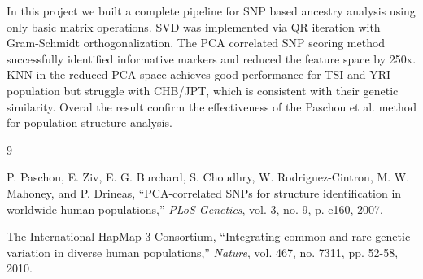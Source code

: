 \documentclass[conference]{IEEEtran}
\begin{document}
In this project we built a complete pipeline for SNP based ancestry analysis using only basic matrix operations. SVD was implemented via QR iteration with Gram-Schmidt orthogonalization. The PCA correlated SNP scoring method successfully identified informative markers and reduced the feature space by 250x. KNN in the reduced PCA space achieves good performance for TSI and YRI population but struggle with CHB/JPT, which is consistent with their genetic similarity. Overal the result confirm the effectiveness of the Paschou et al. method for population structure analysis.

\begin{thebibliography}{9}

P. Paschou, E. Ziv, E. G. Burchard, S. Choudhry, W. Rodriguez-Cintron, M. W. Mahoney, and P. Drineas,
``PCA-correlated SNPs for structure identification in worldwide human populations,''
\textit{PLoS Genetics}, vol. 3, no. 9, p. e160, 2007.

The International HapMap 3 Consortium,
``Integrating common and rare genetic variation in diverse human populations,''
\textit{Nature}, vol. 467, no. 7311, pp. 52-58, 2010.

\end{thebibliography}
\end{document}
